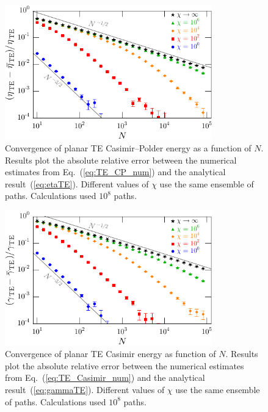 \begin{figure}
  \centering
  \includegraphics[width=0.8\textwidth]{fig/temp/conv_TEatomN3}
  \caption[Convergence of planar TE Casimir--Polder energy as function of $N$.  ]{
    Convergence of planar TE Casimir--Polder energy as a function of $N$.  
    Results plot the absolute relative error between the numerical estimates from Eq.~(\ref{eq:TE_CP_num})
    and the analytical result~(\ref{eq:etaTE}). 
    Different values of $\chi$ use the same ensemble of paths.
    Calculations used $10^8$ paths.}
  \label{fig:conv_atom}
\end{figure}

\begin{figure}
  \centering
  \includegraphics[width=0.8\textwidth]{fig/temp/conv_TE2wallN3}
  \caption[Convergence of planar TE Casimir energy as function of $N$.]{
    Convergence of planar TE Casimir energy as function of $N$.  Results plot the 
    absolute relative error between the numerical estimates from Eq.~(\ref{eq:TE_Casimir_num})
    and the analytical result~(\ref{eq:gammaTE}).
    Different values of $\chi$ use the same ensemble of paths.
    Calculations used $10^8$ paths.}
  \label{fig:conv_wall}
\end{figure}

